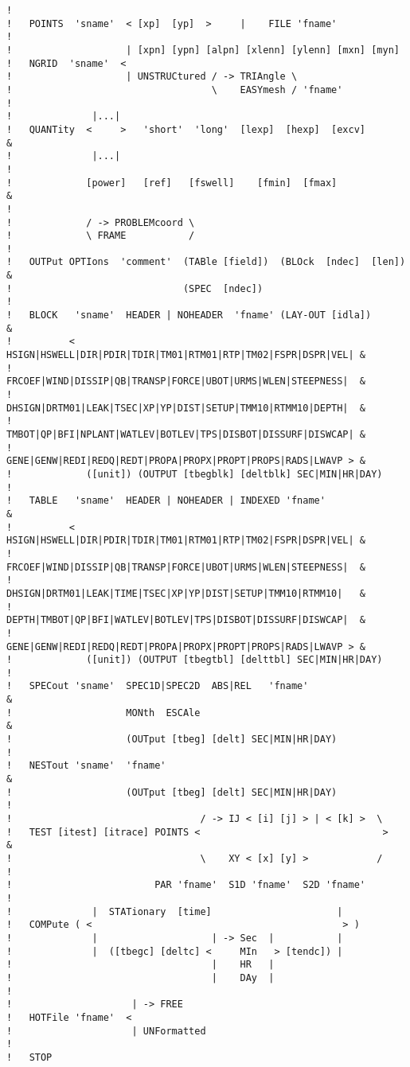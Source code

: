 \documentclass[12pt]{book}
\begin{document}
\begin{verbatim}
!
!   POINTS  'sname'  < [xp]  [yp]  >     |    FILE 'fname'
!
!                    | [xpn] [ypn] [alpn] [xlenn] [ylenn] [mxn] [myn]
!   NGRID  'sname'  <
!                    | UNSTRUCtured / -> TRIAngle \
!                                   \    EASYmesh / 'fname'
!
!              |...|
!   QUANTity  <     >   'short'  'long'  [lexp]  [hexp]  [excv]             &
!              |...|
!
!             [power]   [ref]   [fswell]    [fmin]  [fmax]                  &
!
!             / -> PROBLEMcoord \
!             \ FRAME           /
!
!   OUTPut OPTIons  'comment'  (TABle [field])  (BLOck  [ndec]  [len])      &
!                              (SPEC  [ndec])
!
!   BLOCK   'sname'  HEADER | NOHEADER  'fname' (LAY-OUT [idla])            &
!          <  HSIGN|HSWELL|DIR|PDIR|TDIR|TM01|RTM01|RTP|TM02|FSPR|DSPR|VEL| &
!             FRCOEF|WIND|DISSIP|QB|TRANSP|FORCE|UBOT|URMS|WLEN|STEEPNESS|  &
!             DHSIGN|DRTM01|LEAK|TSEC|XP|YP|DIST|SETUP|TMM10|RTMM10|DEPTH|  &
!             TMBOT|QP|BFI|NPLANT|WATLEV|BOTLEV|TPS|DISBOT|DISSURF|DISWCAP| &
!             GENE|GENW|REDI|REDQ|REDT|PROPA|PROPX|PROPT|PROPS|RADS|LWAVP > &
!             ([unit]) (OUTPUT [tbegblk] [deltblk] SEC|MIN|HR|DAY)
!
!   TABLE   'sname'  HEADER | NOHEADER | INDEXED 'fname'                    &
!          <  HSIGN|HSWELL|DIR|PDIR|TDIR|TM01|RTM01|RTP|TM02|FSPR|DSPR|VEL| &
!             FRCOEF|WIND|DISSIP|QB|TRANSP|FORCE|UBOT|URMS|WLEN|STEEPNESS|  &
!             DHSIGN|DRTM01|LEAK|TIME|TSEC|XP|YP|DIST|SETUP|TMM10|RTMM10|   &
!             DEPTH|TMBOT|QP|BFI|WATLEV|BOTLEV|TPS|DISBOT|DISSURF|DISWCAP|  &
!             GENE|GENW|REDI|REDQ|REDT|PROPA|PROPX|PROPT|PROPS|RADS|LWAVP > &
!             ([unit]) (OUTPUT [tbegtbl] [delttbl] SEC|MIN|HR|DAY)
!
!   SPECout 'sname'  SPEC1D|SPEC2D  ABS|REL   'fname'                       &
!                    MONth  ESCAle                                          &
!                    (OUTput [tbeg] [delt] SEC|MIN|HR|DAY)
!
!   NESTout 'sname'  'fname'                                                &
!                    (OUTput [tbeg] [delt] SEC|MIN|HR|DAY)
!
!                                 / -> IJ < [i] [j] > | < [k] >  \
!   TEST [itest] [itrace] POINTS <                                >         &
!                                 \    XY < [x] [y] >            /
!
!                         PAR 'fname'  S1D 'fname'  S2D 'fname'
!
!              |  STATionary  [time]                      |
!   COMPute ( <                                            > )
!              |                    | -> Sec  |           |
!              |  ([tbegc] [deltc] <     MIn   > [tendc]) |
!                                   |    HR   |
!                                   |    DAy  |
!
!                     | -> FREE
!   HOTFile 'fname'  <
!                     | UNFormatted
!
!   STOP
\end{verbatim}
\end{document}
